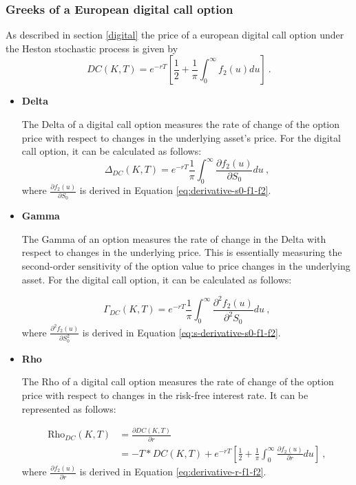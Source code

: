 



\subsubsection{Greeks of a European digital call option}
As described in section \ref{digital} the price of a european digital call option under the Heston stochastic process is given by
$$
DC(K,T) = e^{-r T}  \left[ \frac{1}{2} + \frac{1}{\pi}\int_0^{\infty}f_2(u) du \right]  \ .
$$


\begin{itemize}
\item \textbf{Delta} 

The Delta of a digital call option measures the rate of change of the option price with respect to changes in the underlying asset's price. For the digital call option, it can be calculated as follows:
$$
\Delta_{DC}(K,T) =  e^{-r T}   \frac{1}{\pi}\int_0^{\infty}  \frac{\partial f_2(u)}{\partial S_0}  du  \ , 
$$
where $\frac{\partial f_2(u)}{\partial S_0}$ is derived in Equation \ref{eq:derivative-s0-f1-f2}.


\item \textbf{Gamma} 

The Gamma of an option measures the rate of change in the Delta with respect to changes in the underlying price. This is essentially measuring the second-order sensitivity of the option value to price changes in the underlying asset. For the digital call option, it can be calculated as follows:

$$
\Gamma_{DC}(K,T) =  e^{-r T}   \frac{1}{\pi}\int_0^{\infty}  \frac{\partial^2 f_2(u)}{\partial^2 S_0}  du \ , 
$$
where $\frac{\partial^2 f_2(u)}{\partial S_0^2}$ is derived in Equation \ref{eq:s-derivative-s0-f1-f2}.


\item \textbf{Rho} 

The Rho of a digital call option measures the rate of change of the option price with respect to changes in the risk-free interest rate. It can be represented as follows:


$$
\begin{aligned}
\text{Rho}_{DC}(K,T) &= 
\frac{ \partial DC(K,T) }{\partial r} 
\\ &=
-T * DC(K,T) + e^{-r T}  \left[ \frac{1}{2} + \frac{1}{\pi}\int_0^{\infty} \frac{ \partial f_2(u)}{\partial r}  du \right] \ ,
\end{aligned}
$$
where $\frac{\partial f_2(u)}{\partial r}$ is derived in Equation \ref{eq:derivative-r-f1-f2}.





\end{itemize}
